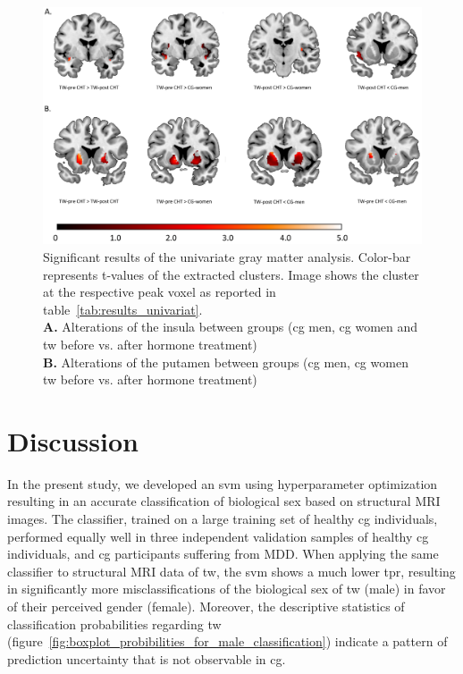 \documentclass{article}
\begin{document}
    \begin{figure}[ht]
        \begin{center}
            \includegraphics[scale=0.13]{img/results_univariate_gray_matter_analysis.png}
        \end{center}
        \caption[]{Significant results of the univariate gray matter analysis. Color-bar represents t-values of the extracted clusters. Image shows the cluster at the respective peak voxel as reported in table~\ref{tab:results_univariat}. \\
            \textbf{A.} Alterations of the insula between groups (\acl{cg} men, \acl{cg} women and \acl{tw} before vs. after hormone treatment)\\
            \textbf{B.} Alterations of the putamen between groups (\acl{cg} men, \acl{cg} women \acl{tw} before vs. after hormone treatment)
        }
        \label{fig:results_univariate_gray_matter_analysis}
    \end{figure}


    \section{Discussion}
    In the present study, we developed an \ac{svm} using hyperparameter optimization resulting in an accurate classification of biological sex based on structural MRI images. The classifier, trained on a large training set of healthy \ac{cg} individuals, performed equally well in three independent validation samples of healthy \ac{cg} individuals, and \ac{cg} participants suffering from MDD. When applying the same classifier to structural MRI data of \ac{tw}, the \ac{svm} shows a much lower \ac{tpr}, resulting in significantly more misclassifications of the biological sex of \ac{tw} (male) in favor of their perceived gender (female). Moreover, the descriptive statistics of classification probabilities regarding \ac{tw} (figure~\ref{fig:boxplot_probibilities_for_male_classification}) indicate a pattern of prediction uncertainty that is not observable in \ac{cg}.
\end{document}
